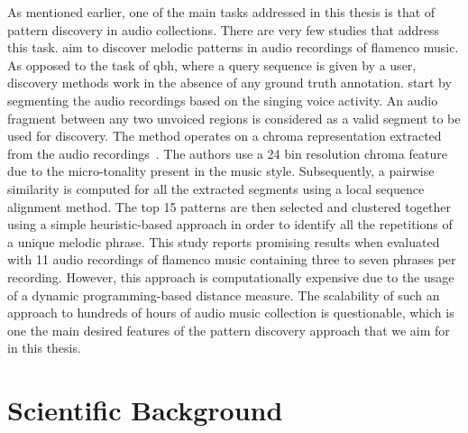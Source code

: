 As mentioned earlier, one of the main tasks addressed in this thesis is that of pattern discovery in audio collections. There are very few studies that address this task. \cite{kroher2015discovery} aim to discover melodic patterns in audio recordings of flamenco music. As opposed to the task of \gls{qbh}, where a query sequence is given by a user, discovery methods work in the absence of any ground truth annotation. \cite{kroher2015discovery} start by segmenting the audio recordings based on the singing voice activity. An audio fragment between any two unvoiced regions is considered as a valid segment to be used for discovery. The method operates on a chroma representation extracted from the audio recordings~\citep{bartsch2005audio}. The authors use a 24 bin resolution chroma feature due to the micro-tonality present in the music style. Subsequently, a pairwise similarity is computed for all the extracted segments using a local sequence alignment method. The top 15 patterns are then selected and clustered together using a simple heuristic-based approach in order to identify all the repetitions of a unique melodic phrase. This study reports promising results when evaluated with 11 audio recordings of flamenco music containing three to seven phrases per recording. However, this approach is computationally expensive due to the usage of a dynamic programming-based distance measure. The scalability of such an approach to hundreds of hours of audio music collection is questionable, which is one the main desired features of the pattern discovery approach that we aim for in this thesis. 



%
%


%
\section{Scientific Background}
\label{sec:background_scientific_background}


